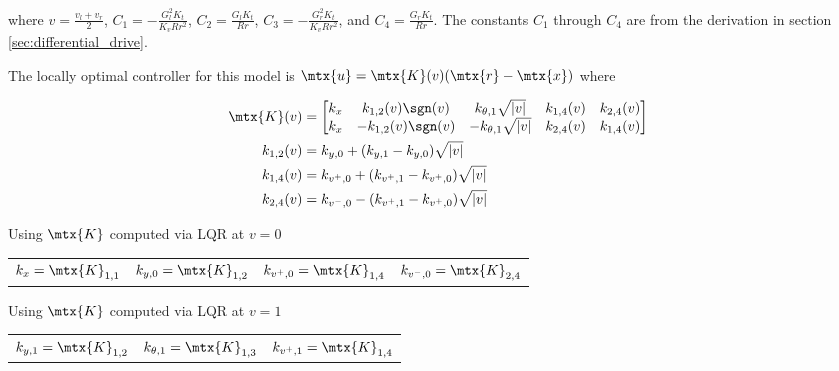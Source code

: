 \begin{theorem}
  where $v = \frac{v_l + v_r}{2}$, $C_1 = -\frac{G_l^2 K_t}{K_v R r^2}$,
  $C_2 = \frac{G_l K_t}{Rr}$, $C_3 = -\frac{G_r^2 K_t}{K_v R r^2}$, and
  $C_4 = \frac{G_r K_t}{Rr}$. The constants $C_1$ through $C_4$ are from the
  derivation in section \ref{sec:differential_drive}.

  The locally optimal controller for this model is
  $\mtx{u} = \mtx{K}(v) (\mtx{r} - \mtx{x})$ where

  \begin{align}
    \mtx{K}(v) &= \begin{bmatrix}
      k_x & k_{1, 2}(v) \sgn(v) & k_{\theta, 1} \sqrt{|v|} & k_{1, 4}(v) &
        k_{2, 4}(v) \\
      k_x & -k_{1, 2}(v) \sgn(v) & -k_{\theta, 1} \sqrt{|v|} & k_{2, 4}(v) &
        k_{1, 4}(v)
    \end{bmatrix} \\
    k_{1, 2}(v) &= k_{y, 0} + (k_{y, 1} - k_{y, 0}) \sqrt{|v|} \\
    k_{1, 4}(v) &= k_{v^+, 0} + (k_{v^+, 1} - k_{v^+, 0}) \sqrt{|v|} \\
    k_{2, 4}(v) &= k_{v^-, 0} - (k_{v^+, 1} - k_{v^+, 0}) \sqrt{|v|}
  \end{align}

  Using $\mtx{K}$ computed via LQR at $v = 0$
  \begin{figurekey}
    \begin{tabular}{llll}
      $k_x = \mtx{K}_{1, 1}$ &
        $k_{y, 0} = \mtx{K}_{1, 2}$ &
        $k_{v^+, 0} = \mtx{K}_{1, 4}$ &
        $k_{v^-, 0} = \mtx{K}_{2, 4}$
    \end{tabular}
  \end{figurekey}

  Using $\mtx{K}$ computed via LQR at $v = 1$
  \begin{figurekey}
    \begin{tabular}{lll}
        $k_{y, 1} = \mtx{K}_{1, 2}$ &
        $k_{\theta, 1} = \mtx{K}_{1, 3}$ &
        $k_{v^+, 1} = \mtx{K}_{1, 4}$
    \end{tabular}
  \end{figurekey}
\end{theorem}


